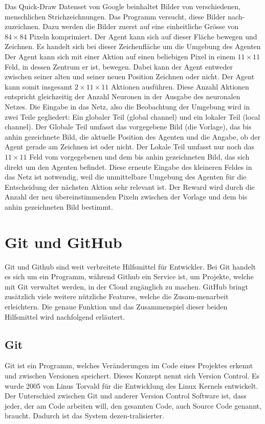 Das Quick-Draw Datenset von Google beinhaltet Bilder von verschiedenen,
menschlichen Strichzeichnungen. Das Programm versucht, diese Bilder
nach\hyp{}zuzeichnen. Dazu werden die Bilder zuerst auf eine einheitliche Grösse von
$84\times84$ Pixeln komprimiert. Der Agent kann sich auf dieser Fläche bewegen und
Zeichnen. Es handelt sich bei dieser Zeichenfläche um die Umgebung des Agenten
Der Agent kann sich mit einer Aktion auf einen beliebigen Pixel in einem $11\times11$
Feld, in dessen Zentrum er ist, bewegen. Dabei kann der Agent entweder zwischen
seiner alten und seiner neuen Position Zeichnen oder nicht. Der Agent kann somit
insgesamt $2\times11\times11$ Aktionen ausführen. Diese Anzahl Aktionen entspricht
gleichzeitig der Anzahl Neuronen in der Ausgabe des neuronalen Netzes. Die
Eingabe in das Netz, also die Beobachtung der Umgebung wird in zwei Teile
gegliedert: Ein globaler Teil (global channel) und ein lokaler Teil (local
channel). Der Globale Teil umfasst das vorgegebene Bild (die Vorlage), das bis
anhin gezeichnete Bild, die aktuelle Position des Agenten und die Angabe, ob der
Agent gerade am Zeichnen ist oder nicht. Der Lokale Teil umfasst nur noch das
$11\times11$ Feld vom vorgegebenen und dem bis anhin gezeichneten Bild, das sich direkt
um den Agenten befindet. Diese erneute Eingabe des kleineren Feldes in das Netz
ist notwendig, weil die unmittelbare Umgebung des Agenten für die Entscheidung
der nächsten Aktion sehr relevant ist. Der Reward wird durch die Anzahl der neu
übereinstimmenden Pixeln zwischen der Vorlage und dem bis anhin
gezeichneten Bild bestimmt.

\section{Git und GitHub}
\label{chap:git_github}
Git und Github sind weit verbreitete Hilfsmittel für Entwickler. Bei Git handelt
es sich um ein Programm, während Github ein Service ist, um Projekte, welche mit
Git verwaltet werden, in der Cloud zugänglich zu machen. GitHub bringt zusätzlich
viele weitere nützliche Features, welche die Zusam\hyp{}menarbeit erleichtern. Die
genaue Funktion und das Zusammenspiel dieser beiden Hilfsmittel wird nachfolgend
erläutert.

\subsection*{Git}
Git ist ein Programm, welches Veränderungen im Code eines Projektes erkennt und
zwischen Versionen speichert. Dieses Konzept nennt sich Version Control. Es
wurde 2005 von Linus Torvald für die Entwicklung des Linux Kernels entwickelt.
Der Unterschied zwischen Git und anderer Version Control Software ist, dass
jeder, der am Code arbeiten will, den gesamten Code, auch Source Code genannt,
braucht. Dadurch ist das System dezen\hyp{}tralisierter.
\cite{noauthor_git_2021}

